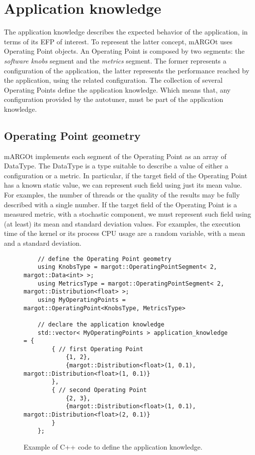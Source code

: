 \section{Application knowledge}

The application knowledge describes the expected behavior of the application, in terms of its EFP of interest.
To represent the latter concept, mARGOt uses Operating Point objects.
An Operating Point is composed by two segments: the \textit{software knobs} segment and the \textit{metrics} segment.
The former represents a configuration of the application, the latter represents the performance reached by the application, using the related configuration.
The collection of several Operating Points define the application knowledge.
Which means that, any configuration provided by the autotuner, must be part of the application knowledge.


\subsection{Operating Point geometry}

mARGOt implements each segment of the Operating Point as an array of DataType.
The DataType is a type suitable to describe a value of either a configuration or a metric.
In particular, if the target field of the Operating Point has a known static value, we can represent such field using just its mean value.
For examples, the number of threads or the quality of the results may be fully described with a single number.
If the target field of the Operating Point is a measured metric, with a stochastic component, we must represent such field using (at least) its mean and standard deviation values.
For examples, the execution time of the kernel or its process CPU usage are a random variable, with a mean and a standard deviation.

\begin{figure}[!t]
	\centering
	\lstset{language=MyCPP}
	\begin{lstlisting}
	// define the Operating Point geometry
	using KnobsType = margot::OperatingPointSegment< 2, margot::Data<int> >;
	using MetricsType = margot::OperatingPointSegment< 2, margot::Distribution<float> >;
	using MyOperatingPoints = margot::OperatingPoint<KnobsType, MetricsType>
	
	// declare the application knowledge
	std::vector< MyOperatingPoints > application_knowledge = {
		{ // first Operating Point
			{1, 2},
			{margot::Distribution<float>(1, 0.1), margot::Distribution<float>(1, 0.1)}
		},
		{ // second Operating Point
			{2, 3},
			{margot::Distribution<float>(1, 0.1), margot::Distribution<float>(2, 0.1)}
		}
	};
	\end{lstlisting}
	\caption{Example of C++ code to define the application knowledge.}
	\label{fig:operating_point_examples}
\end{figure}

